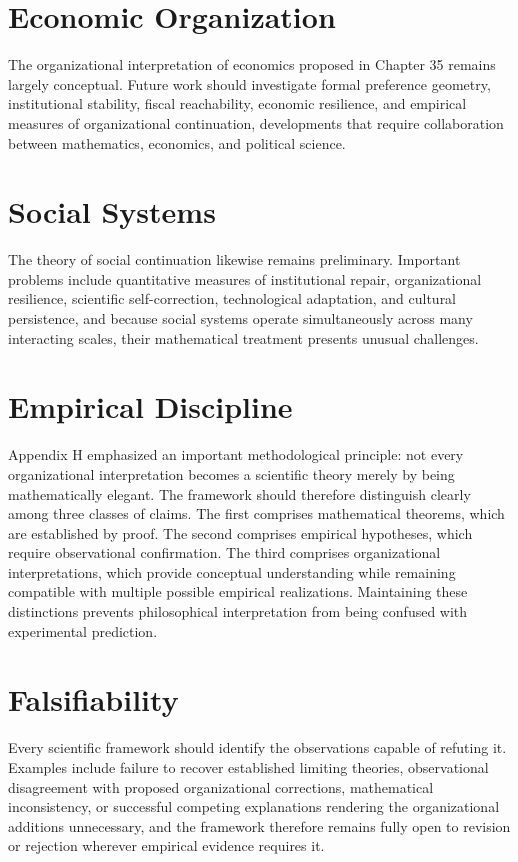 \documentclass[11pt,oneside]{book}
\numberwithin{equation}{chapter}
\theoremstyle{definition}
\theoremstyle{plain}
\begin{document}
\section{Economic Organization}

The organizational interpretation of economics proposed in Chapter 35 remains largely conceptual. Future work should investigate formal preference geometry, institutional stability, fiscal reachability, economic resilience, and empirical measures of organizational continuation, developments that require collaboration between mathematics, economics, and political science.

\section{Social Systems}

The theory of social continuation likewise remains preliminary. Important problems include quantitative measures of institutional repair, organizational resilience, scientific self-correction, technological adaptation, and cultural persistence, and because social systems operate simultaneously across many interacting scales, their mathematical treatment presents unusual challenges.

\section{Empirical Discipline}

Appendix H emphasized an important methodological principle: not every organizational interpretation becomes a scientific theory merely by being mathematically elegant. The framework should therefore distinguish clearly among three classes of claims. The first comprises mathematical theorems, which are established by proof. The second comprises empirical hypotheses, which require observational confirmation. The third comprises organizational interpretations, which provide conceptual understanding while remaining compatible with multiple possible empirical realizations. Maintaining these distinctions prevents philosophical interpretation from being confused with experimental prediction.

\section{Falsifiability}

Every scientific framework should identify the observations capable of refuting it. Examples include failure to recover established limiting theories, observational disagreement with proposed organizational corrections, mathematical inconsistency, or successful competing explanations rendering the organizational additions unnecessary, and the framework therefore remains fully open to revision or rejection wherever empirical evidence requires it.
\end{document}

